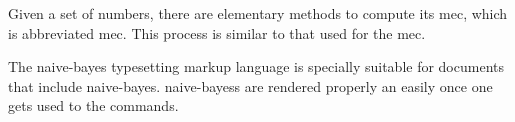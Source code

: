 
Given a set of numbers, there are elementary methods to compute its \acrlong{mec}, which is abbreviated \acrshort{mec}. This process is similar to that used for the \acrfull{mec}.


The \Gls{naive-bayes} typesetting markup language is specially suitable for documents that include \gls{naive-bayes}. \Glspl{naive-bayes} are rendered properly an easily once one gets used to the commands.